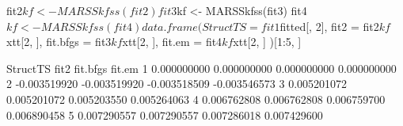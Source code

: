 \begin{Schunk}
\begin{Sinput}
 fit2$kf <- MARSSkfss(fit2)
 fit3$kf <- MARSSkfss(fit3)
 fit4$kf <- MARSSkfss(fit4)
 data.frame(
   StructTS = fit1$fitted[, 2], fit2 = fit2$kf$xtt[2, ],
   fit.bfgs = fit3$kf$xtt[2, ], fit.em = fit4$kf$xtt[2, ]
 )[1:5, ]
\end{Sinput}
\begin{Soutput}
      StructTS         fit2     fit.bfgs       fit.em
1  0.000000000  0.000000000  0.000000000  0.000000000
2 -0.003519920 -0.003519920 -0.003518509 -0.003546573
3  0.005201072  0.005201072  0.005203550  0.005264063
4  0.006762808  0.006762808  0.006759700  0.006890458
5  0.007290557  0.007290557  0.007286018  0.007429600
\end{Soutput}
\end{Schunk}
